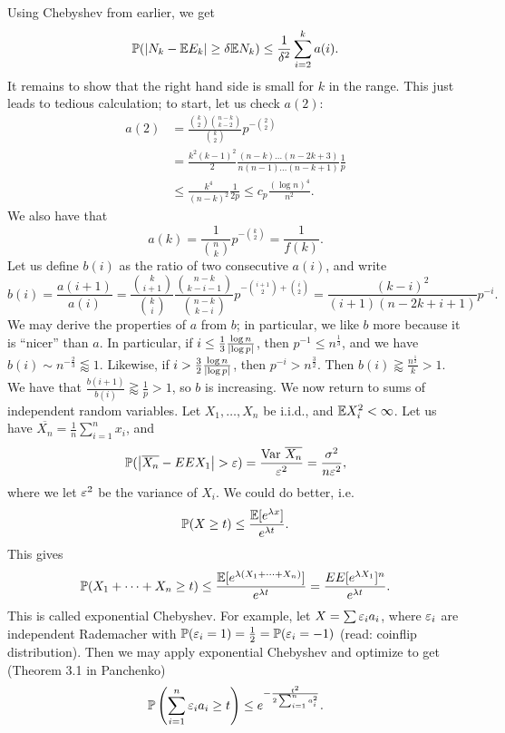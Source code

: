 Using Chebyshev from earlier, we get
\[ \mathbb P(\left\lvert N_k - \mathbb E E_k \right\rvert \geq \delta \mathbb E N_k) \leq \frac{1}{\delta^2} \sum_{i=2}^k a(i). \]
It remains to show that the right hand side is small for $k$ in the range. This just leads to tedious calculation; to start, let us check $a(2)$:
\begin{align*}
    a(2) &= \frac{\binom{k}{2} \binom{n-k}{k-2}}{\binom{k}{2}} p^{-\binom{2}{2}} \\
    &= \frac{k^2 (k-1)^2}{2} \frac{(n-k) \dots (n-2k+3)}{n(n-1) \dots (n-k+1)} \frac{1}{p} \\
    &\leq \frac{k^4}{(n - k)^2} \frac{1}{2p} \leq c_p \frac{(\log n)^4}{n^2}.
\end{align*}
We also have that
\[ a(k) = \frac{1}{\binom{n}{k}} p^{-\binom{k}{2}} = \frac{1}{f(k)}. \]
Let us define $b(i)$ as the ratio of two consecutive $a(i)$, and write
\[ b(i) = \frac{a(i+1)}{a(i)} = \frac{\binom{k}{i+1}}{\binom{k}{i}} \frac{\binom{n-k}{k-i-1}}{\binom{n-k}{k-i}} p^{-\binom{i+1}{2} + \binom{i}{2}} = \frac{(k-i)^2}{(i + 1)(n - 2k + i + 1)} p^{-i}. \]
We may derive the properties of $a$ from $b$; in particular, we like $b$ more because it is ``nicer'' than $a$. In particular, if $i \leq \frac{1}{3} \frac{\log n}{\left\lvert \log p \right\rvert}$, then $p^{-1} \leq n^{\frac{1}{3}}$, and we have $b(i) \sim n^{-\frac{2}{3}} \lessapprox 1$.
\medskip\newline
Likewise, if $i > \frac{3}{2} \frac{\log n}{\left\lvert \log p \right\rvert}$, then $p^{-i} > n^{\frac{3}{2}}$. Then $b(i) \gtrapprox \frac{n^{\frac{1}{2}}}{k} > 1$. We have that $\frac{b(i + 1)}{b(i)} \gtrapprox \frac{1}{p} > 1$, so $b$ is increasing.
\medskip\newline
We now return to sums of independent random variables. Let $X_1, \dots, X_n$ be i.i.d., and $\mathbb E X_i^2 < \infty$. Let us have $\overline{X_n} = \frac{1}{n} \sum_{i=1}^n x_i$, and
\[ \mathbb P(\left\lvert \overline{X_n} - EE X_1 \right\rvert > \varepsilon) = \frac{\operatorname{Var} \, \overline{X_n}}{\varepsilon^2} = \frac{\sigma^2}{n \varepsilon^2}, \]
where we let $\varepsilon^2$ be the variance of $X_i$. We could do better, i.e.
\[ \mathbb P(X \geq t) \leq \frac{\mathbb E[e^{\lambda x}]}{e^{\lambda t}}. \]
This gives
\[ \mathbb P(X_1 + \dots + X_n \geq t) \leq \frac{\mathbb E[e^{\lambda(X_1 + \dots + X_n)}]}{e^{\lambda t}} = \frac{EE[e^{\lambda X_1}]^n}{e^{\lambda t}}. \]
This is called exponential Chebyshev. For example, let $X = \sum \varepsilon_i a_i$, where $\varepsilon_i$ are independent Rademacher with $\mathbb P(\varepsilon_i = 1) = \frac{1}{2} = \mathbb P(\varepsilon_i = -1)$ (read: coinflip distribution). Then we may apply exponential Chebyshev and optimize to get (Theorem 3.1 in Panchenko)
\[ \mathbb P \left( \sum_{i=1}^n \varepsilon_i a_i \geq t \right) \leq e^{-\frac{t^2}{2 \sum_{i=1}^n a_i^2}}. \]

